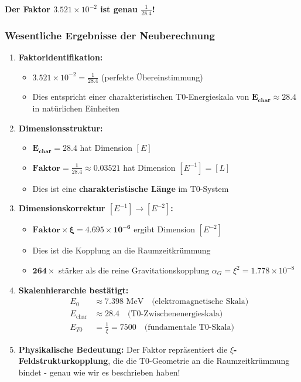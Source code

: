 \documentclass[12pt,a4paper]{report}
\begin{document}
	\textbf{Der Faktor $3.521 \times 10^{-2}$ ist genau $\frac{1}{28.4}$!}
	
	\subsubsection{Wesentliche Ergebnisse der Neuberechnung}
	
	\begin{enumerate}
		\item \textbf{Faktoridentifikation:}
		\begin{itemize}
			\item $3.521 \times 10^{-2} = \frac{1}{28.4}$ (perfekte Übereinstimmung)
			\item Dies entspricht einer charakteristischen T0-Energieskala von $\mathbf{E_{\text{char}} \approx 28.4}$ in natürlichen Einheiten
		\end{itemize}
		
		\item \textbf{Dimensionsstruktur:}
		\begin{itemize}
			\item $\mathbf{E_{\text{char}} = 28.4}$ hat Dimension $[E]$
			\item $\mathbf{\text{Faktor} = \frac{1}{28.4} \approx 0.03521}$ hat Dimension $[E^{-1}] = [L]$
			\item Dies ist eine \textbf{charakteristische Länge} im T0-System
		\end{itemize}
		
		\item \textbf{Dimensionskorrektur $[E^{-1}] \rightarrow [E^{-2}]$:}
		\begin{itemize}
			\item $\mathbf{\text{Faktor} \times \xi = 4.695 \times 10^{-6}}$ ergibt Dimension $[E^{-2}]$
			\item Dies ist die Kopplung an die Raumzeitkrümmung
			\item $\mathbf{264\times}$ stärker als die reine Gravitationskopplung $\alpha_G = \xi^2 = 1.778 \times 10^{-8}$
		\end{itemize}
		
		\item \textbf{Skalenhierarchie bestätigt:}
		\begin{align}
			E_0 &\approx 7.398 \text{ MeV} \quad \text{(elektromagnetische Skala)} \\
			E_{\text{char}} &\approx 28.4 \quad \text{(T0-Zwischenenergieskala)} \\
			E_{T0} &= \frac{1}{\xi} = 7500 \quad \text{(fundamentale T0-Skala)}
		\end{align}
		
		\item \textbf{Physikalische Bedeutung:}
		Der Faktor repräsentiert die \textbf{$\xi$-Feldstrukturkopplung}, die die T0-Geometrie an die Raumzeitkrümmung bindet - genau wie wir es beschrieben haben!
	\end{enumerate}
	
\end{document}
